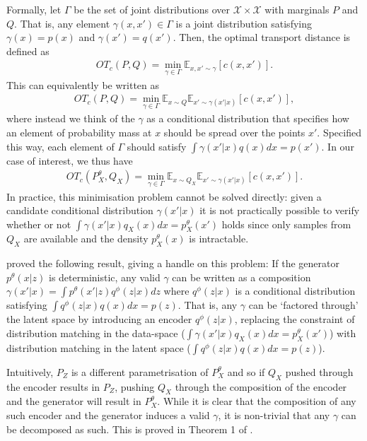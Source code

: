 Formally, let $\Gamma$ be the set of joint distributions over $\mathcal{X} \times \mathcal{X}$ with marginals $P$ and $Q$. 
That is, any element $\gamma(x, x') \in \Gamma$ is a joint distribution satisfying $\gamma(x) = p(x)$ and $\gamma(x') = q(x')$.
Then, the optimal transport distance is defined as
%
\begin{align*}
OT_c(P, Q) = \min_{\gamma \in \Gamma} \mathbb{E}_{x, x' \sim \gamma} \left[ c(x, x') \right].
\end{align*}
%
This can equivalently be written as
%
\begin{align*}
OT_c(P, Q) = \min_{\gamma \in \Gamma} \mathbb{E}_{x\sim Q} \mathbb{E}_{x'\sim \gamma(x'|x)} \left[ c(x, x') \right],
\end{align*}
%
where instead we think of the $\gamma$ as a conditional distribution that specifies how an element of probability mass at $x$ should be spread over the points $x'$. 
Specified this way, each element of $\Gamma$ should satisfy $\int \gamma(x'|x) q(x) dx = p(x')$.
In our case of interest, we thus have
%
\begin{align*}
OT_c(P_X^\theta, Q_X) = \min_{\gamma \in \Gamma} \mathbb{E}_{x\sim Q_X} \mathbb{E}_{x'\sim \gamma(x'|x)} \left[ c(x, x') \right].
\end{align*}
%
In practice, this minimisation problem cannot be solved directly: given a candidate conditional distribution $\gamma(x'|x)$ it is not practically possible to verify whether or not $\int \gamma(x'|x) q_X(x) dx = p_X^\theta(x')$ holds since only samples from $Q_X$ are available and the density $p^\theta_X(x)$ is intractable.

\cite{tolstikhin2017wasserstein} proved the following result, giving a handle on this problem:
If the generator $p^\theta(x|z)$ is deterministic, any valid $\gamma$ can be written as a composition $\gamma(x'|x) = \int p^\theta(x'|z) q^\phi(z|x) dz$ where $q^\phi(z|x)$ is a conditional distribution satisfying $\int q^\phi(z|x) q(x) dx = p(z)$. 
That is, any $\gamma$ can be `factored through' the latent space by introducing an encoder $q^\phi(z|x)$, replacing the constraint of distribution matching in the data-space ($\int \gamma(x'|x) q_X(x) dx = p_X^\theta(x')$) with distribution matching in the latent space ($\int q^\phi(z|x) q(x) dx = p(z)$).

Intuitively, $P_Z$ is a different parametrisation of $P_X^\theta$ and so if $Q_X$ pushed through the encoder results in $P_Z$, pushing $Q_X$ through the composition of the encoder and the generator will result in $P_X^\theta$. 
While it is clear that the composition of any such encoder and the generator induces a valid $\gamma$, it is non-trivial that any $\gamma$ can be decomposed as such. 
This is proved in Theorem 1 of \cite{tolstikhin2017wasserstein}.

